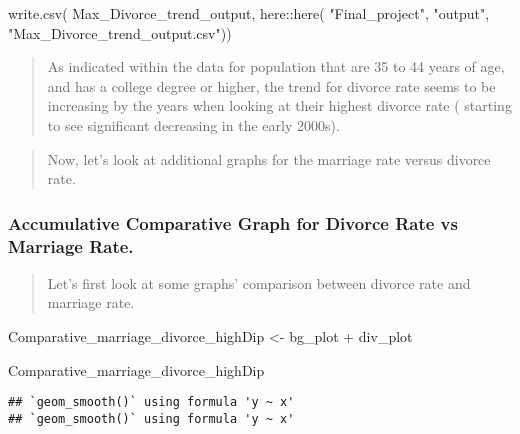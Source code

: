 \documentclass[
]{article}
\newenvironment{Shaded}{\begin{snugshade}}{\end{snugshade}}
\newcommand{\FunctionTok}[1]{\textcolor[rgb]{0.00,0.00,0.00}{#1}}
\newcommand{\NormalTok}[1]{#1}
\newcommand{\OtherTok}[1]{\textcolor[rgb]{0.56,0.35,0.01}{#1}}
\newcommand{\SpecialCharTok}[1]{\textcolor[rgb]{0.00,0.00,0.00}{#1}}
\newcommand{\StringTok}[1]{\textcolor[rgb]{0.31,0.60,0.02}{#1}}
\begin{document}
\begin{Shaded}
\begin{Highlighting}[]
\FunctionTok{write.csv}\NormalTok{(}
\NormalTok{  Max\_Divorce\_trend\_output,}
\NormalTok{          here}\SpecialCharTok{::}\FunctionTok{here}\NormalTok{(}
            \StringTok{"Final\_project"}\NormalTok{, }
            \StringTok{"output"}\NormalTok{, }
            \StringTok{"Max\_Divorce\_trend\_output.csv"}\NormalTok{))}
\end{Highlighting}
\end{Shaded}

\begin{quote}
As indicated within the data for population that are 35 to 44 years of
age, and has a college degree or higher, the trend for divorce rate
seems to be increasing by the years when looking at their highest
divorce rate ( starting to see significant decreasing in the early
2000s).
\end{quote}

\begin{quote}
Now, let's look at additional graphs for the marriage rate versus
divorce rate.
\end{quote}

\hypertarget{accumulative-comparative-graph-for-divorce-rate-vs-marriage-rate.}{%
\subsubsection{Accumulative Comparative Graph for Divorce Rate vs
Marriage
Rate.}\label{accumulative-comparative-graph-for-divorce-rate-vs-marriage-rate.}}

\begin{quote}
Let's first look at some graphs' comparison between divorce rate and
marriage rate.
\end{quote}

\begin{Shaded}
\begin{Highlighting}[]
\NormalTok{Comparative\_marriage\_divorce\_highDip }\OtherTok{\textless{}{-}}\NormalTok{ bg\_plot }\SpecialCharTok{+}\NormalTok{ div\_plot}

\NormalTok{Comparative\_marriage\_divorce\_highDip}
\end{Highlighting}
\end{Shaded}

\begin{verbatim}
## `geom_smooth()` using formula 'y ~ x'
## `geom_smooth()` using formula 'y ~ x'
\end{verbatim}
\end{document}
